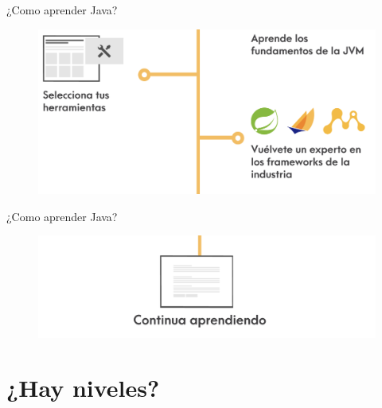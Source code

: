 \documentclass[aspectratio=169]{beamer}
\begin{document}
\begin{frame}{¿Como aprender Java?}
     \begin{figure}
            \centering
            \includegraphics[width=0.7\linewidth]{Images/camino2}
        \end{figure}
\end{frame}

\begin{frame}{¿Como aprender Java?}
     \begin{figure}
            \centering
            \includegraphics[width=0.7\linewidth]{Images/camino3}
        \end{figure}
\end{frame}

{
	\section{¿Hay niveles?}
}
\end{document}
